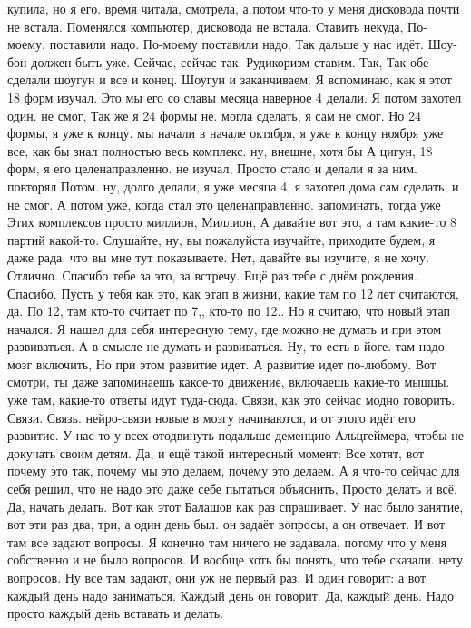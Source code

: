 купила, но я его.
время читала, смотрела, а потом что-то у меня дисковода почти не встала. Поменялся компьютер, дисковода не встала.
Ставить некуда, По-моему.
поставили надо.
По-моему поставили надо.
Так дальше у нас идёт.
Шоу-бон должен быть уже.
Сейчас, сейчас так.
Рудикоризм ставим.
Так, Так обе сделали шоугун и все и конец.
Шоугун и заканчиваем.
Я вспоминаю, как я этот 18 форм изучал.
Это мы его со славы месяца наверное 4 делали.
Я потом захотел один.
не смог, Так же я 24 формы не.
могла сделать, я сам не смог.
Но 24 формы, я уже к концу. мы начали в начале октября, я уже к концу ноября уже все, как бы знал полностью весь комплекс. ну, внешне, хотя бы А цигун, 18 форм, я его целенаправленно.
не изучал, Просто стало и делали я за ним.
повторял Потом. ну, долго делали, я уже месяца 4, я захотел дома сам сделать, и не смог. А потом уже, когда стал это целенаправленно.
запоминать, тогда уже Этих комплексов просто миллион, Миллион, А давайте вот это, а там какие-то 8 партий какой-то. Слушайте, ну, вы пожалуйста изучайте, приходите будем, я даже рада.
что вы мне тут показываете.
Нет, давайте вы изучите, я не хочу.
Отлично.
Спасибо тебе за это, за встречу.
Ещё раз тебе с днём рождения.
Спасибо.
Пусть у тебя как это, как этап в жизни, какие там по 12 лет считаются, да.
По 12, там кто-то считает по 7,, кто-то по 12..
Но я считаю, что новый этап начался. Я нашел для себя интересную тему, где можно не думать и при этом развиваться.
А в смысле не думать и развиваться.
Ну, то есть в йоге. там надо мозг включить, Но при этом развитие идет.
А развитие идет по-любому.
Вот смотри, ты даже запоминаешь какое-то движение, включаешь какие-то мышцы. уже там, какие-то ответы идут туда-сюда.
Связи, как это сейчас модно говорить.
Связи.
Связь.
нейро-связи новые в мозгу начинаются, и от этого идёт его развитие.
У нас-то у всех отодвинуть подальше деменцию Альцгеймера, чтобы не докучать своим детям.
Да, и ещё такой интересный момент: Все хотят, вот почему это так, почему мы это делаем, почему это делаем. А я что-то сейчас для себя решил, что не надо это даже себе пытаться объяснить, Просто делать и всё.
Да, начать делать.
Вот как этот Балашов как раз спрашивает.
У нас было занятие, вот эти раз два, три, а один день был. он задаёт вопросы, а он отвечает.
И вот там все задают вопросы.
Я конечно там ничего не задавала, потому что у меня собственно и не было вопросов.
И вообще хоть бы понять, что тебе сказали. нету вопросов.
Ну все там задают, они уж не первый раз.
И один говорит: а вот каждый день надо заниматься.
Каждый день он говорит.
Да, каждый день.
Надо просто каждый день вставать и делать.
